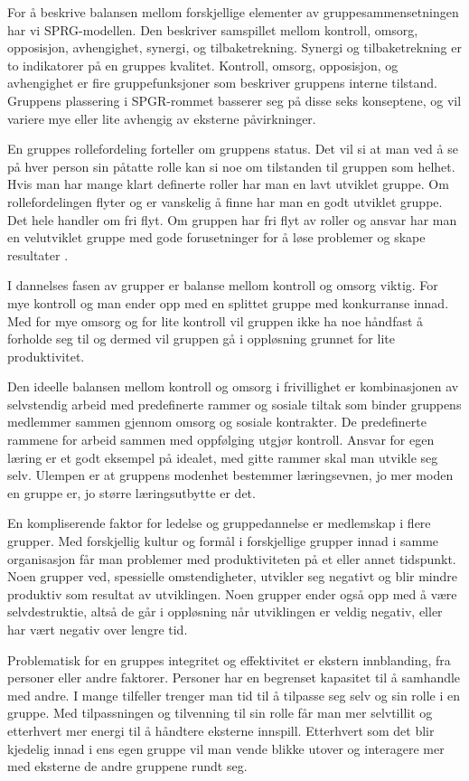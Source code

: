 \documentclass[12pt, a4paper]{article}
\begin{document}
For å beskrive balansen mellom forskjellige elementer av gruppesammensetningen
har vi SPRG-modellen. Den beskriver samspillet mellom kontroll, omsorg,
opposisjon, avhengighet, synergi, og tilbaketrekning. Synergi og
tilbaketrekning er to indikatorer på en gruppes kvalitet. Kontroll,
omsorg, opposisjon, og avhengighet er fire gruppefunksjoner som beskriver
gruppens interne tilstand. Gruppens plassering i SPGR-rommet basserer seg på
disse seks konseptene, og vil variere mye eller lite avhengig av eksterne
påvirkninger. 

En gruppes rollefordeling forteller om gruppens status. Det vil si at man ved å
se på hver person sin påtatte rolle kan si noe om tilstanden til gruppen som
helhet. Hvis man har mange klart definerte roller har man en lavt utviklet
gruppe. Om rollefordelingen flyter og er vanskelig å finne har man en godt
utviklet gruppe. Det hele handler om fri flyt. Om gruppen har fri flyt av
roller og ansvar har man en velutviklet gruppe med gode forusetninger for å
løse problemer og skape resultater \cite[]{teamet}.  

I dannelses fasen av grupper er balanse mellom kontroll og omsorg viktig. For
mye kontroll og man ender opp med en splittet gruppe med konkurranse innad. Med
for mye omsorg og for lite kontroll vil gruppen ikke ha noe håndfast å forholde
seg til og dermed vil gruppen gå i oppløsning grunnet for lite produktivitet.

Den ideelle balansen mellom kontroll og omsorg i frivillighet er kombinasjonen
av selvstendig arbeid med predefinerte rammer og sosiale tiltak som binder
gruppens medlemmer sammen gjennom omsorg og sosiale kontrakter. 
De predefinerte rammene for arbeid sammen med oppfølging utgjør kontroll. 
Ansvar for egen læring er et godt eksempel på idealet, med gitte rammer skal
man utvikle seg selv. Ulempen er at gruppens modenhet bestemmer læringsevnen,
jo mer moden en gruppe er, jo større læringsutbytte er det.     

En kompliserende faktor for ledelse og gruppedannelse er medlemskap i flere
grupper. Med forskjellig kultur og formål i forskjellige grupper innad i samme
organisasjon får man problemer med produktiviteten på et eller annet tidspunkt.
Noen grupper ved, spessielle omstendigheter, utvikler seg negativt og blir
mindre produktiv som resultat av utviklingen. Noen grupper ender også opp med å
være selvdestruktie, altså de går i oppløsning når utviklingen er veldig
negativ, eller har vært negativ over lengre tid. \cite[]{teamet} 

Problematisk for en gruppes integritet og effektivitet er ekstern innblanding, fra
personer eller andre faktorer. Personer har en begrenset kapasitet til å
samhandle med andre. I mange tilfeller trenger man tid til å tilpasse seg selv
og sin rolle i en gruppe. Med tilpassningen og tilvenning til sin rolle får man
mer selvtillit og etterhvert mer energi til å håndtere eksterne innspill.
Etterhvert som det blir kjedelig innad i ens egen gruppe vil man vende blikke
utover og interagere mer med eksterne de andre gruppene rundt seg.   
\end{document}

